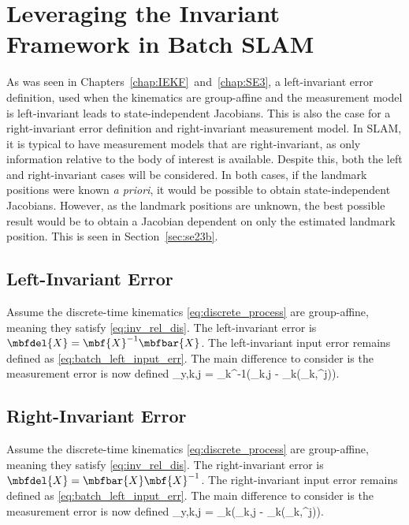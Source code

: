 \section{Leveraging the Invariant Framework in Batch SLAM}
\label{sec:inv_slam}

As was seen in Chapters~\ref{chap:IEKF}~and~\ref{chap:SE3}, a left-invariant error definition, used when the kinematics are group-affine and the measurement model is left-invariant leads to state-independent Jacobians. This is also the case for a right-invariant error definition and right-invariant measurement model. In SLAM, it is typical to have measurement models that are right-invariant, as only information relative to the body of interest is available. Despite this, both the left and right-invariant cases will be considered. In both cases, if the landmark positions were known \textit{a priori}, it would be possible to obtain state-independent Jacobians. However, as the landmark positions are unknown, the best possible result would be to obtain a Jacobian dependent on only the estimated landmark position. This is seen in Section~\ref{sec:se23b}.

\subsection{Left-Invariant Error}

Assume the discrete-time kinematics \eqref{eq:discrete_process} are group-affine, meaning they satisfy \eqref{eq:inv_rel_dis}. The left-invariant error is $\mbfdel{X} = \mbf{X}^{-1}\mbfbar{X}$. The left-invariant input error remains defined as \eqref{eq:batch_left_input_err}. The main difference to consider is the measurement error is now defined
\bdis
	_{y,k,j} = _k^{-1}\left(_{k,j} - _k(_k,^j)\right).
\edis


\subsection{Right-Invariant Error}

Assume the discrete-time kinematics \eqref{eq:discrete_process} are group-affine, meaning they satisfy \eqref{eq:inv_rel_dis}. The right-invariant error is $\mbfdel{X} = \mbfbar{X}\mbf{X}^{-1}$. The right-invariant input error remains defined as \eqref{eq:batch_left_input_err}. The main difference to consider is the measurement error is now defined
\bdis
	_{y,k,j} = _k\left(_{k,j} - _k(_k,^j)\right).
\edis



